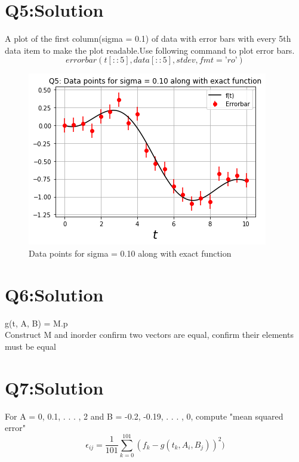 \documentclass[11pt, a4paper]{article}
\begin{document}
\section*{Q5:Solution}
A plot of the first column(sigma = 0.1) of data with error bars with every 5th data item to make the plot readable.Use following command to plot error bars.
\begin{equation*}
 errorbar(t[::5],data[::5],stdev,fmt=’ro’)
\end{equation*}
\begin{figure}[!tbh]
   	\centering
   	\includegraphics[scale=0.5]{Q5plot.png}  %
   	\caption{Data points for sigma = 0.10 along with exact function}
\end{figure} 

\section*{Q6:Solution}
g(t, A, B) = M.p \\
Construct M and inorder confirm two vectors are equal, confirm their elements must be equal

\section*{Q7:Solution}
For A = 0, 0.1, . . . , 2 and B = -0.2, -0.19, . . . , 0, compute "mean squared error" 
\begin{equation}
  \epsilon_{ij} = \frac{1}{101}\sum_{k=0}^{101}(f_k - g(t_k, A_i, B_j))^2)
\end{equation}
\end{document}

